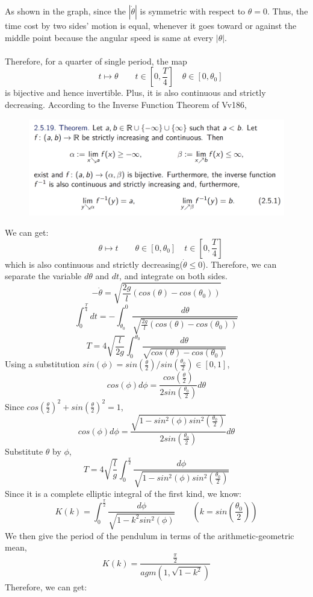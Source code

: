 \documentclass[12pt,a4paper]{article}
\begin{document}
As shown in the graph, since the $|\dot \theta|$ is symmetric with respect to $\theta=0$. Thus, the time cost by two sides' motion is equal, whenever it goes toward or against the middle point because the angular speed is same at every $|\theta|$.\\\\
Therefore, for a quarter of single period, the map
$$\quad t\mapsto\theta\qquad t\in[0,\frac{T}{4}]\quad \theta\in[0,\theta_0] $$ 
is bijective and hence invertible. Plus, it is also continuous and strictly decreasing.
According to the Inverse Function Theorem of Vv186,
\begin{figure}[H]
\centering
\includegraphics[width=\textwidth]{inverse.png}
\end{figure} 
We can get:
$$\quad \theta\mapsto t\qquad \theta\in[0,\theta_0]\quad t\in[0,\frac{T}{4}] $$ 
which is also continuous and strictly decreasing($\dot \theta \leq 0$).
Therefore, we can separate the variable $d\theta$ and $dt$, and integrate on both sides.
$$-\dot \theta=\sqrt{\frac{2g}{l}(cos(\theta)-cos(\theta_0))}$$
$$\int_0^{\frac{T}{4}}dt=-\int_{\theta_0}^0\frac{d \theta}{\sqrt{\frac{2g}{l}(cos(\theta)-cos(\theta_0))}}$$
$$T=4\sqrt{\frac{l}{2g}}\int_0^{\theta_0}\frac{d \theta}{\sqrt{cos(\theta)-cos(\theta_0)}}$$
Using a substitution $sin(\phi)=sin(\frac{\theta}{2})/sin(\frac{\theta_0}{2})\in[0,1]$,
$$cos(\phi)d\phi=\frac{cos(\frac{\theta}{2})}{2sin({\frac{\theta_0}{2}})}d\theta$$
Since $cos(\frac{\theta}{2})^2+sin(\frac{\theta}{2})^2=1$,
$$cos(\phi)d\phi=\frac{\sqrt{1-sin^2(\phi)sin^2(\frac{\theta_0}{2})}}{2sin({\frac{\theta_0}{2}})}d\theta$$
Substitute $\theta$ by $\phi$,
$$T=4\sqrt{\frac{l}{g}}\int_0^{\frac{\pi}{2}}\frac{d\phi}{\sqrt{1-sin^2(\phi)sin^2(\frac{\theta_0}{2})}}$$
Since it is a complete elliptic integral of the first kind, we know:
$$K(k)=\int_0^{\frac{\pi}{2}}\frac{d\phi}{\sqrt{1-k^2sin^2(\phi)}}\qquad (k=sin(\frac{\theta_0}{2}))$$
We then give the period of the pendulum in terms of the arithmetic-geometric mean,
$$K(k)=\frac{\frac{\pi}{2}}{agm(1,\sqrt{1-k^2})}$$
Therefore, we can get:
\end{document}
